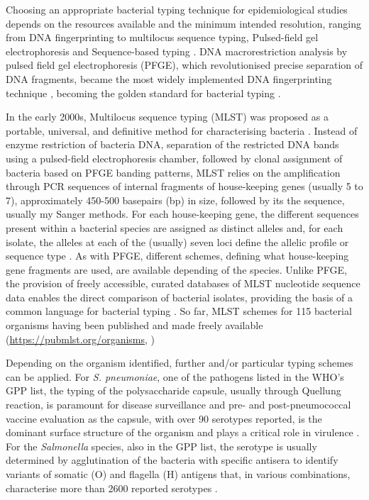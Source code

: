 Choosing an appropriate bacterial typing technique for epidemiological studies depends on the resources available and the minimum intended resolution, ranging from DNA fingerprinting to multilocus sequence typing, Pulsed-field gel electrophoresis and Sequence-based typing \citep{allerberger_molecular_2012,foxman_choosing_2005}. DNA macrorestriction analysis by pulsed field gel electrophoresis (PFGE), which revolutionised precise separation of DNA fragments, became the most widely implemented DNA fingerprinting technique \citep{allerberger_molecular_2012}, becoming the golden standard for bacterial typing \citep{neoh_pulsed-field_2019} .

In the early 2000s, Multilocus sequence typing (MLST) was proposed as a portable, universal, and definitive method for characterising bacteria \citep{maiden_multilocus_2006}. Instead of enzyme restriction of bacteria DNA, separation of the restricted DNA bands using a pulsed-field electrophoresis chamber, followed by clonal assignment of bacteria based on PFGE banding patterns, MLST relies on the amplification through PCR sequences of internal fragments of house-keeping genes (usually 5 to 7), approximately 450-500 basepairs (bp) in size, followed by its the sequence, usually my Sanger methods. For each house-keeping gene, the different sequences present within a bacterial species are assigned as distinct alleles and, for each isolate, the alleles at each of the (usually) seven loci define the allelic profile or sequence type \citep{larsen_multilocus_2012}. As with PFGE, different schemes, defining what house-keeping gene fragments are used, are available depending of the species. Unlike PFGE, the provision of freely accessible, curated databases of MLST nucleotide sequence data enables the direct comparison of bacterial isolates, providing the basis of a common language for bacterial typing \citep{maiden_multilocus_2006}. So far, MLST schemes for 115 bacterial organisms having been published and made freely available (\url{https://pubmlst.org/organisms}, \cite{jolley_open-access_2018}) 

Depending on the organism identified, further and/or particular typing schemes can be applied. For \textit{S. pneumoniae}, one of the pathogens listed in the WHO's GPP list, the typing of the polysaccharide capsule, usually through Quellung reaction, is paramount for disease surveillance and pre- and post-pneumococcal vaccine evaluation as the capsule, with over 90 serotypes reported, is the dominant surface structure of the organism and plays a critical role in virulence \citep{jauneikaite_current_2015, paton_streptococcus_2019}. For the \textit{Salmonella} species, also in the GPP list, the serotype is usually determined by agglutination of the bacteria with specific antisera to identify variants of somatic (O) and flagella (H) antigens that, in various combinations, characterise more than 2600 reported serotypes \citep{diep_salmonella_2019}. 

